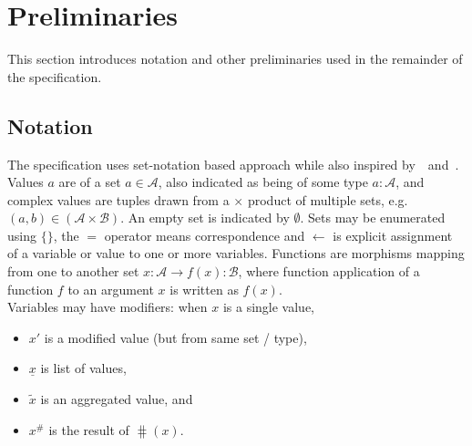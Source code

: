 \clearpage
\section{Preliminaries}\label{sec:prel}

This section introduces notation and other preliminaries used in the remainder
of the specification.

\subsection{Notation}

The specification uses set-notation based approach while also inspired
by~\cite{eutxo-2}~and~\cite{eutxo}. Values $a$ are of a set
$a \in \mathcal{A}$, also indicated as being of some type $a : \mathcal{A}$, and
complex values are tuples drawn from a $\times$ product of multiple sets, e.g.
$(a,b) \in (\mathcal{A} \times \mathcal{B})$. An empty set is indicated by
$\emptyset$. Sets may be enumerated using $\{\}$, the $=$ operator means
correspondence and $\gets$ is explicit assignment of a variable or value to one
or more variables. Functions are morphisms mapping from one to another set
$x : \mathcal{A} \to f(x) : \mathcal{B}$, where function
application of a function $f$ to an argument $x$ is written as $f(x)$. \\


\noindent Variables may have modifiers: when $x$ is a single value,
\begin{itemize}
  \item $x'$ is a modified value (but from same set / type),
  \item $\underline{x}$ is list of values,
  \item $\tilde{x}$ is an aggregated value, and
  \item $x^{\#}$ is the result of $\hash(x)$.
\end{itemize}

